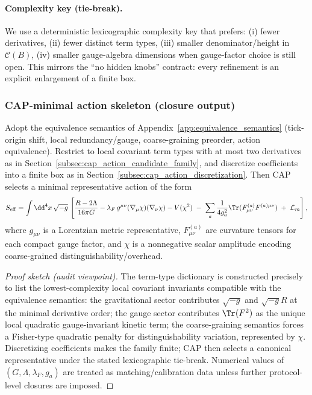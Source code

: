\paragraph{Complexity key (tie-break).}
\AuditTag We use a deterministic lexicographic complexity key that prefers:
(i) fewer derivatives, (ii) fewer distinct term types, (iii) smaller denominator/height in $\mathcal{C}(B)$, (iv) smaller gauge-algebra dimensions when gauge-factor choice is still open.
This mirrors the ``no hidden knobs'' contract: every refinement is an explicit enlargement of a finite box.

\subsubsection{CAP-minimal action skeleton (closure output)}
\label{subsec:cap_minimal_action_output}

\begin{proposition}
\label{prop:cap_minimal_action_skeleton}
Adopt the equivalence semantics of Appendix~\ref{app:equivalence_semantics} (tick-origin shift, local redundancy/gauge, coarse-graining preorder, action equivalence).
Restrict to local covariant term types with at most two derivatives as in Section~\ref{subsec:cap_action_candidate_family}, and discretize coefficients into a finite box as in Section~\ref{subsec:cap_action_discretization}.
Then CAP selects a minimal representative action of the form
\begin{equation}
\label{eq:cap_minimal_action_skeleton}
S_{\mathrm{eff}}
=\int \dd^{4}x\,\sqrt{-g}\,
\left[
\frac{R-2\Lambda}{16\pi G}
-\lambda_F\, g^{\mu\nu}(\nabla_\mu\chi)(\nabla_\nu\chi)
-V(\chi^{2})
\;-\;\sum_{a}\frac{1}{4g_a^2}\Tr(F^{(a)}_{\mu\nu}F^{(a)\mu\nu})
\;+\;\mathcal{L}_{m}
\right],
\end{equation}
where $g_{\mu\nu}$ is a Lorentzian metric representative, $F^{(a)}_{\mu\nu}$ are curvature tensors for each compact gauge factor, and $\chi$ is a nonnegative scalar amplitude encoding coarse-grained distinguishability/overhead.
\end{proposition}

\begin{proof}[Proof sketch (audit viewpoint)]
The term-type dictionary is constructed precisely to list the lowest-complexity local covariant invariants compatible with the equivalence semantics:
the gravitational sector contributes $\sqrt{-g}$ and $\sqrt{-g}R$ at the minimal derivative order;
the gauge sector contributes $\Tr(F^2)$ as the unique local quadratic gauge-invariant kinetic term;
the coarse-graining semantics forces a Fisher-type quadratic penalty for distinguishability variation, represented by $\chi$.
Discretizing coefficients makes the family finite; CAP then selects a canonical representative under the stated lexicographic tie-break.
Numerical values of $(G,\Lambda,\lambda_F,g_a)$ are treated as matching/calibration data unless further protocol-level closures are imposed.
\end{proof}

